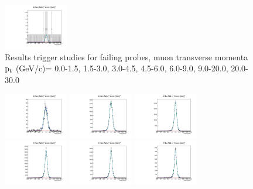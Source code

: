 \documentclass{article}
\begin{document}
\begin{figure}
    \includegraphics[width=0.25\textwidth]{../PlotsRooFitMC/croofit_trg_fail_6.pdf}
    \caption{Results trigger studies for failing probes, muon transverse momenta
    $\rm p_{t}$ (GeV/c)= {0.0-1.5}, {1.5-3.0}, {3.0-4.5}, {4.5-6.0}, 
    {6.0-9.0}, {9.0-20.0}, {20.0-30.0}}
\end{figure}


\begin{figure}
    \includegraphics[width=0.25\textwidth]{../PlotsRooFitMC/croofit_trk_pass_0.pdf}
    \includegraphics[width=0.25\textwidth]{../PlotsRooFitMC/croofit_trk_pass_1.pdf}
    \includegraphics[width=0.25\textwidth]{../PlotsRooFitMC/croofit_trk_pass_2.pdf}
    \includegraphics[width=0.25\textwidth]{../PlotsRooFitMC/croofit_trk_pass_3.pdf}
    \includegraphics[width=0.25\textwidth]{../PlotsRooFitMC/croofit_trk_pass_4.pdf}
    \includegraphics[width=0.25\textwidth]{../PlotsRooFitMC/croofit_trk_pass_5.pdf}

\end{figure}
\end{document}
